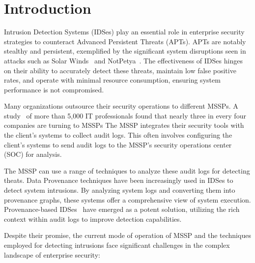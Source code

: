 \section{Introduction}
\label{s:intro}

Intrusion Detection Systems (IDSes) play an essential role in enterprise security strategies to counteract Advanced Persistent Threats (APTs). APTs are notably stealthy and persistent, exemplified by the significant system disruptions seen in attacks such as Solar Winds~\cite{solarwinds} and NotPetya~\cite{notpetya}. The effectiveness of IDSes hinges on their ability to accurately detect these threats, maintain low false positive rates, and operate with minimal resource consumption, ensuring system performance is not compromised.


Many organizations outsource their security operations to different MSSPs. A study~\cite{msspsurvey}  of more than 5,000 IT professionals found that nearly three in every four companies are turning to MSSPs The MSSP integrates their security tools with the client's systems to collect audit logs. This often involves configuring the client’s systems to send audit logs to the MSSP's security operations center (SOC) for analysis. 

The MSSP can use a range of techniques to analyze these audit logs for detecting theats. Data Provenance techniques have been increasingly used in IDSes to detect system intrusions. By analyzing system logs and converting them into provenance graphs, these systems offer a comprehensive view of system execution. Provenance-based IDSes~\cite{streamspot,provdetector2020,wang2022threatrace,shadewatcher,yangprographer,han2020unicorn} have emerged as a potent solution, utilizing the rich context within audit logs to improve detection capabilities.

Despite their promise, the current mode of operation of MSSP and the techniques employed for detecting intrusions face significant challenges in the complex landscape of enterprise security:

